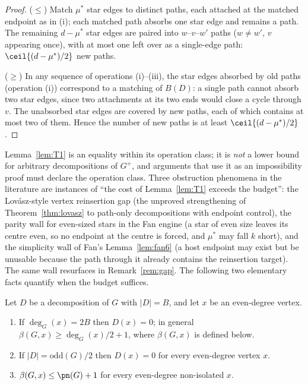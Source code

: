 \begin{proof}
($\le$) Match $\mu^*$ star edges to distinct paths, each attached at the matched endpoint as in
(i); each matched path absorbs one star edge and remains a path. The remaining $d-\mu^*$ star
edges are paired into $w$--$v$--$w'$ paths ($w\ne w'$, $v$ appearing once), with at most one
left over as a single-edge path: $\ceil{(d-\mu^*)/2}$ new paths.

($\ge$) In any sequence of operations (i)--(iii), the star edges absorbed by old paths (operation
(i)) correspond to a matching of $B(D)$: a single path cannot absorb two star edges, since two
attachments at its two ends would close a cycle through $v$. The unabsorbed star edges are
covered by new paths, each of which contains at most two of them. Hence the number of new paths
is at least $\ceil{(d-\mu^*)/2}$.
\end{proof}

\begin{remark}\label{rem:T1scope}
Lemma~\ref{lem:T1} is an equality within its operation class; it is \emph{not} a lower bound
for arbitrary decompositions of $G^+$, and arguments that use it as an impossibility proof must
declare the operation class. Three obstruction phenomena in the literature are instances of
``the cost of Lemma~\ref{lem:T1} exceeds the budget'': the Lov\'asz-style vertex reinsertion
gap (the unproved strengthening of Theorem~\ref{thm:lovasz} to path-only decompositions with
endpoint control), the parity wall for even-sized stars in the Fan engine (a star of even size
leaves its centre even, so no endpoint at the centre is forced, and $\mu^*$ may fall $k$ short),
and the simplicity wall of Fan's Lemma~\ref{lem:fan6} (a host endpoint may exist but be
unusable because the path through it already contains the reinsertion target). The same wall
resurfaces in Remark~\ref{rem:gap}. The following two elementary facts quantify when the budget
suffices.
\end{remark}

\begin{proposition}\label{prop:buried}
Let $D$ be a decomposition of $G$ with $|D|=B$, and let $x$ be an even-degree vertex.
\begin{enumerate}[label={\rm(\roman*)},leftmargin=2em]
\item If $\deg_G(x)=2B$ then $D(x)=0$; in general $\beta(G,x)\ge\deg_G(x)/2+1$, where
$\beta(G,x)$ is defined below.
\item If $|D|=\mathrm{odd}(G)/2$ then $D(x)=0$ for every even-degree vertex $x$.
\item $\beta(G,x)\le\pn(G)+1$ for every even-degree non-isolated $x$.
\end{enumerate}
\end{proposition}

